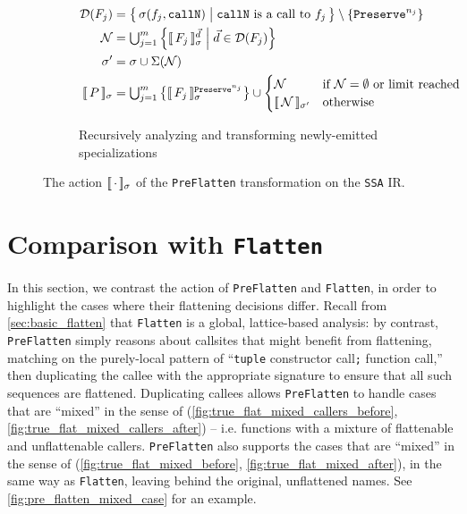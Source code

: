 \begin{figure}[htbp]
  \begin{subfigure}{\textwidth}
    \caption{Recursively analyzing and transforming newly-emitted specializations}
    \label{fig:preflatten_recurse}
    \[
    \begin{aligned}
      \mathcal{D}(F_j)
        &= \big\{\, \sigma(f_j, \texttt{callN}) \;\big|\; \texttt{callN} \text{ is a call to } f_j \,\big\}
           \setminus \{ \texttt{Preserve}^{n_j} \} \\
      \mathcal{N}
        &= \textstyle\bigcup_{j=1}^{m}
             \left\{ \flatsem{F_j}^{\vec{d}} \;\middle|\; \vec{d} \in \mathcal{D}(F_j) \right\} \\
      \sigma'
        &= \sigma \cup \Sigma(\mathcal{N}) \\
      \flatsem{P}
        &= \textstyle\bigcup_{j=1}^{m} \left\{ \flatsem{F_j}^{\texttt{Preserve}^{n_j}} \right\}
           \cup
           \begin{cases}
             \mathcal{N}
               & \text{if } \mathcal{N} = \emptyset \text{ or limit reached} \\
             \sembrack{\mathcal{N}}_{\sigma'}
               & \text{otherwise}
           \end{cases}
    \end{aligned}
    \]
  \end{subfigure}

  \caption{The action $[\![\, \cdot \,]\!]_{\sigma}$ of the \texttt{PreFlatten} transformation
    on the \texttt{SSA} IR.}
  \label{fig:tuple_flattening_impl}
\end{figure}

\FloatBarrier

\section{Comparison with \texttt{Flatten}}
\label{sec:preflatten_comparison_flatten}
In this section, we contrast the action of \texttt{PreFlatten}
and \texttt{Flatten}, in order to highlight the cases where their flattening
decisions differ. Recall from \cref{sec:basic_flatten} that \texttt{Flatten} is
a global, lattice-based analysis: by contrast,
\texttt{PreFlatten} simply reasons about callsites
that might benefit from flattening, matching on the purely-local pattern of
``\texttt{tuple} constructor call\texttt{;} function call,'' then duplicating
the callee with the appropriate signature to ensure that all such sequences are
flattened. Duplicating callees allows \texttt{PreFlatten} to handle cases that
are ``mixed'' in the sense of
(\cref{fig:true_flat_mixed_callers_before}, \cref{fig:true_flat_mixed_callers_after})
-- i.e. functions with a mixture of flattenable and unflattenable callers.
\texttt{PreFlatten} also supports the cases that are ``mixed'' in the sense of
(\cref{fig:true_flat_mixed_before}, \cref{fig:true_flat_mixed_after}), in the
same way as \texttt{Flatten}, leaving behind the original, unflattened names.
See \cref{fig:pre_flatten_mixed_case} for an example.


